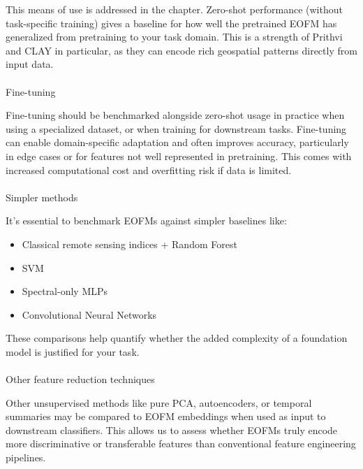 \documentclass[
  letterpaper,
  DIV=11,
  numbers=noendperiod]{scrreprt}
\makeatletter
\let\oldparagraph\paragraph
\renewcommand{\paragraph}{
    \@ifstar
      \xxxParagraphStar
      \xxxParagraphNoStar
  }
\newcommand{\xxxParagraphStar}[1]{\oldparagraph*{#1}\mbox{}}
\newcommand{\xxxParagraphNoStar}[1]{\oldparagraph{#1}\mbox{}}
\providecommand{\tightlist}{%
  \setlength{\itemsep}{0pt}\setlength{\parskip}{0pt}}\usepackage{longtable,booktabs,array}
\makeatother
\begin{document}
This means of use is addressed in the chapter. Zero-shot performance
(without task-specific training) gives a baseline for how well the
pretrained EOFM has generalized from pretraining to your task domain.
This is a strength of Prithvi and CLAY in particular, as they can encode
rich geospatial patterns directly from input data.

\paragraph{Fine-tuning}\label{fine-tuning}

Fine-tuning should be benchmarked alongside zero-shot usage in practice
when using a specialized dataset, or when training for downstream tasks.
Fine-tuning can enable domain-specific adaptation and often improves
accuracy, particularly in edge cases or for features not well
represented in pretraining. This comes with increased computational cost
and overfitting risk if data is limited.

\paragraph{Simpler methods}\label{simpler-methods}

It's essential to benchmark EOFMs against simpler baselines like:

\begin{itemize}
\tightlist
\item
  Classical remote sensing indices + Random Forest
\item
  SVM
\item
  Spectral-only MLPs
\item
  Convolutional Neural Networks
\end{itemize}

These comparisons help quantify whether the added complexity of a
foundation model is justified for your task.

\paragraph{Other feature reduction
techniques}\label{other-feature-reduction-techniques}

Other unsupervised methods like pure PCA, autoencoders, or temporal
summaries may be compared to EOFM embeddings when used as input to
downstream classifiers. This allows us to assess whether EOFMs truly
encode more discriminative or transferable features than conventional
feature engineering pipelines.
\end{document}
